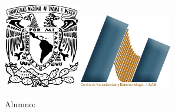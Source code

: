 \documentclass{report}
\begin{document}
\begin{titlepage}
\includegraphics[width = 33mm]{unam.png}
\hfill
\includegraphics[width = 40mm]{cnyn.png}
\centering
\par
\vspace{3cm}
{\bfseries\LARGE\universidad\par}
\vspace{1cm}
{\scshape\Large\facultad\par}
\vspace{3cm}
{\scshape\Huge\trabajo\par}
\vspace{3cm}
{\itshape\Large\materia\par}
\vfill
{\Large Alumno: \par}
{\Large\alumno\par}
\vfill
{\Large\fecha\par}
\end{titlepage}
\end{document}
